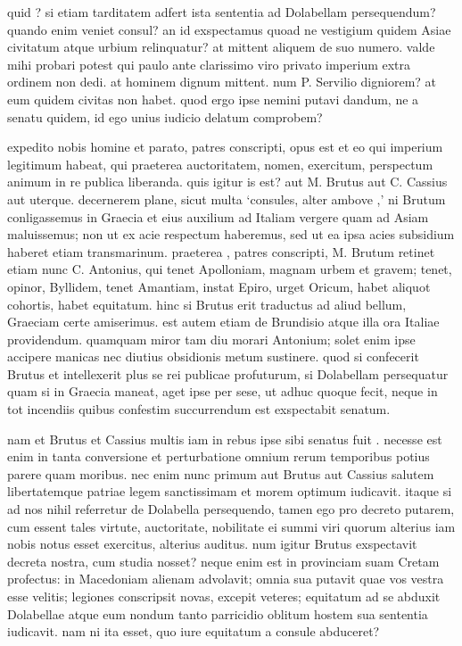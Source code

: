  quid ? si etiam tarditatem adfert ista sententia ad Dolabellam persequendum? quando enim veniet consul? an id exspectamus quoad ne vestigium quidem Asiae civitatum atque urbium relinquatur? at mittent aliquem de suo numero. valde mihi probari potest qui paulo ante clarissimo viro privato imperium extra ordinem non dedi. at hominem dignum mittent. num P. Servilio digniorem? at eum quidem civitas non habet. quod ergo ipse nemini putavi dandum, ne a senatu quidem, id ego unius iudicio delatum comprobem?

 expedito nobis homine et parato, patres conscripti, opus est et eo qui imperium legitimum habeat, qui praeterea auctoritatem, nomen, exercitum, perspectum animum in re publica liberanda. quis igitur is est? aut M. Brutus aut C. Cassius aut uterque. decernerem plane, sicut multa `consules, alter ambove ,' ni Brutum conligassemus in Graecia et eius auxilium ad Italiam vergere quam ad Asiam maluissemus; non ut ex acie respectum haberemus, sed ut ea ipsa acies subsidium haberet etiam transmarinum. praeterea , patres conscripti, M. Brutum retinet etiam nunc C. Antonius, qui tenet Apolloniam, magnam urbem et gravem; tenet, opinor, Byllidem, tenet Amantiam, instat Epiro, urget Oricum, habet aliquot cohortis, habet equitatum. hinc si Brutus erit traductus ad aliud bellum, Graeciam certe amiserimus. est autem etiam de Brundisio atque illa ora Italiae providendum. quamquam miror tam diu morari Antonium; solet enim ipse accipere manicas nec diutius obsidionis metum sustinere. quod si confecerit Brutus et intellexerit plus se rei publicae profuturum, si Dolabellam persequatur quam si in Graecia maneat, aget ipse per sese, ut adhuc quoque fecit, neque in tot incendiis quibus confestim succurrendum est exspectabit senatum.

 nam et Brutus et Cassius multis iam in rebus ipse sibi senatus fuit . necesse est enim in tanta conversione et perturbatione omnium rerum temporibus potius parere quam moribus. nec enim nunc primum aut Brutus aut Cassius salutem libertatemque patriae legem sanctissimam et morem optimum iudicavit. itaque si ad nos nihil referretur de Dolabella persequendo, tamen ego pro decreto putarem, cum essent tales virtute, auctoritate, nobilitate ei summi viri quorum alterius iam nobis notus esset exercitus, alterius auditus. num igitur Brutus exspectavit decreta nostra, cum studia nosset? neque enim est in provinciam suam Cretam profectus: in Macedoniam alienam advolavit; omnia sua putavit quae vos vestra esse velitis; legiones conscripsit novas, excepit veteres; equitatum ad se abduxit Dolabellae atque eum nondum tanto parricidio oblitum hostem sua sententia iudicavit. nam ni ita esset, quo iure equitatum a consule abduceret?

